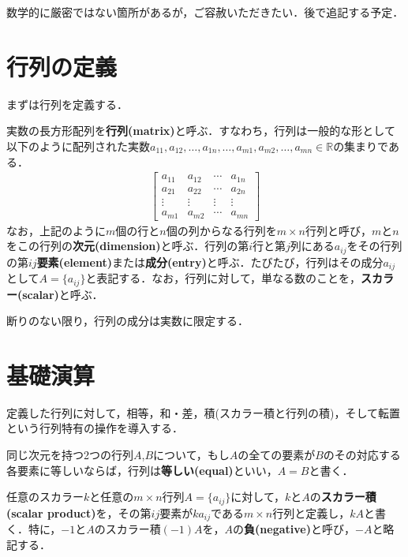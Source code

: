 数学的に厳密ではない箇所があるが，ご容赦いただきたい．後で追記する予定．
\section{行列の定義}

まずは行列を定義する．

\begin{defi}[行列]
実数の長方形配列を{\bf 行列(matrix)}と呼ぶ．すなわち，行列は一般的な形として以下のように配列された実数$a_{11},a_{12},\ldots,a_{1n},\ldots,a_{m1},a_{m2},\ldots,a_{mn} \in \mathbb{R}$の集まりである．
\begin{align*}
\begin{bmatrix}
a_{11} & a_{12} & \cdots & a_{1n} \\
a_{21} & a_{22} & \cdots & a_{2n} \\
\vdots & \vdots & \vdots & \vdots \\
a_{m1} & a_{m2} & \cdots & a_{mn} 
\end{bmatrix}	
\end{align*}
なお，上記のように$m$個の行と$n$個の列からなる行列を$m\times n$行列と呼び，$m$と$n$をこの行列の{\bf 次元(dimension)}と呼ぶ．行列の第$i$行と第$j$列にある$a_{ij}$をその行列の第$ij${\bf 要素(element)}または{\bf 成分(entry)}と呼ぶ．たびたび，行列はその成分$a_{ij}$として$A=\{a_{ij}\}$と表記する．なお，行列に対して，単なる数のことを，{\bf スカラー(scalar)}と呼ぶ．
\end{defi}

\begin{rem}
断りのない限り，行列の成分は実数に限定する．	
\end{rem}

\section{基礎演算}

定義した行列に対して，相等，和・差，積(スカラー積と行列の積)，そして転置という行列特有の操作を導入する．

\begin{defi}[行列の相等]
同じ次元を持つ2つの行列$A$,$B$について，もし$A$の全ての要素が$B$のその対応する各要素に等しいならば，行列は{\bf 等しい(equal)}といい，$A=B$と書く．
\end{defi}

\begin{defi}[スカラー乗法]
任意のスカラー$k$と任意の$m\times n$行列$A=\{a_{ij}\}$に対して，$k$と$A$の{\bf スカラー積(scalar product)}を，その第$ij$要素が$ka_{ij}$である$m\times n$行列と定義し，$kA$と書く．特に，$-1$と$A$のスカラー積$(-1)A$を，$A$の{\bf 負(negative)}と呼び，$-A$と略記する．
\end{defi}

